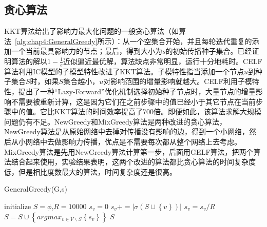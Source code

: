 \subsection{贪心算法}
KKT算法\cite{kempe2003maximizing}给出了影响力最大化问题的一般贪心算法（如算法~\ref{alg:chap4:GeneralGreedy}所示）：从一个空集合开始，并且每轮迭代重复的添加一个当前最具影响力的节点；最后，得到大小为$s$的初始传播种子集合。已经证明算法的解以$1-\frac{1}{e}$近似逼近最优解，算法缺点非常明显，运行十分地耗时。CELF算法\cite{leskovec2007cost}利用IC模型的子模型特性改进了KKT算法。子模特性指当添加一个节点$u$到种子集合$S$时，如果$S$集合越小，$u$对影响范围的增量影响就越大。CELF利用子模特性，提出了一种“Lazy-Forward”优化机制选择初始种子节点时，大量节点的增量影响不需要被重新计算，这是因为它们在之前步骤中的值已经小于其它节点在当前步骤中的值。它比KKT算法的时间效率提高了700倍。即便如此，该算法求解大规模问题仍有不足。NewGreedy和MixGreedy算法\cite{chen2010scalableIM}是两种改进的贪心算法，NewGreedy算法是从原始网络中去掉对传播没有影响的边，得到一个小网络，然后从小网络中去做影响力传播，优点是不需要每次都从整个网络上去考虑。MixGreedy算法是先用NewGreedy算法计算第一步，后面用GELF算法，把两个算法结合起来使用，实验结果表明，这两个改进的算法都比贪心算法的时间复杂度低，但是相比度数最大的算法，时间复杂度还是很高。
\begin{algorithm}
	\caption{GeneralGreedy(G,s)}
	\label{alg:chap4:GeneralGreedy}
	\begin{algorithmic}[1]
		\STATE initialize $S = \phi$,$R=10000$
		\STATE $s_v=0$
		\STATE $s_v +=|\sigma (S\cup \left\lbrace v \right\rbrace )|$
		\ENDFOR
		\STATE $s_v=s_v /R$
		\ENDFOR
		\STATE $S=S \cup \left\lbrace argmax_{v \in V \backslash S}\left\lbrace s_v \right\rbrace \right\rbrace $
		\ENDFOR
		\RETURN $S$
	\end{algorithmic}
\end{algorithm}

